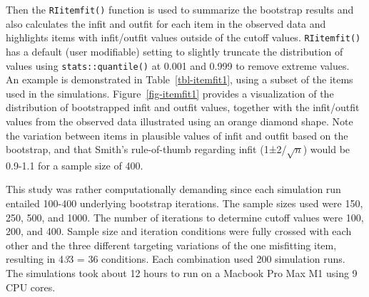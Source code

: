 \documentclass[
  letterpaper,
  DIV=11,
  numbers=noendperiod]{scrartcl}
\begin{document}
Then the \texttt{RIitemfit()} function is used to summarize the
bootstrap results and also calculates the infit and outfit for each item
in the observed data and highlights items with infit/outfit values
outside of the cutoff values. \texttt{RIitemfit()} has a default (user
modifiable) setting to slightly truncate the distribution of values
using \texttt{stats::quantile()} at 0.001 and 0.999 to remove extreme
values. An example is demonstrated in Table~\ref{tbl-itemfit1}, using a
subset of the items used in the simulations. Figure~\ref{fig-itemfit1}
provides a visualization of the distribution of bootstrapped infit and
outfit values, together with the infit/outfit values from the observed
data illustrated using an orange diamond shape. Note the variation
between items in plausible values of infit and outfit based on the
bootstrap, and that Smith's rule-of-thumb regarding infit
(1±2/\(\sqrt{n}\)) would be 0.9-1.1 for a sample size of 400.

This study was rather computationally demanding since each simulation
run entailed 100-400 underlying bootstrap iterations. The sample sizes
used were 150, 250, 500, and 1000. The number of iterations to determine
cutoff values were 100, 200, and 400. Sample size and iteration
conditions were fully crossed with each other and the three different
targeting variations of the one misfitting item, resulting in 4\emph{3}3
= 36 conditions. Each combination used 200 simulation runs. The
simulations took about 12 hours to run on a Macbook Pro Max M1 using 9
CPU cores.
\end{document}
